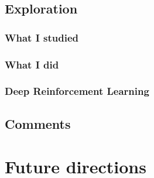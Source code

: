 \subsection{Exploration}

\subsubsection{What I studied}

\subsubsection{What I did}

\subsubsection{Deep Reinforcement Learning}

\subsection{Comments}

\section{Future directions}
